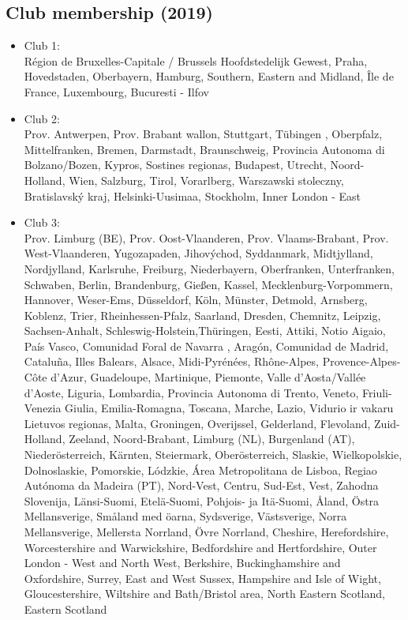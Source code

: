 \documentclass[11pt]{article}
\begin{document}
\subsection{Club membership (2019)}
\begin{itemize}
\item Club 1:\\
Région de Bruxelles-Capitale / Brussels Hoofdstedelijk Gewest, Praha, Hovedstaden, Oberbayern, Hamburg, Southern, Eastern and Midland, Île de France, Luxembourg, Bucuresti - Ilfov
\item Club 2:\\
Prov. Antwerpen, Prov. Brabant wallon, Stuttgart, Tübingen   , Oberpfalz, Mittelfranken, Bremen, Darmstadt, Braunschweig, Provincia Autonoma di Bolzano/Bozen, Kypros, Sostines regionas, Budapest, Utrecht, Noord-Holland, Wien, Salzburg, Tirol, Vorarlberg, Warszawski stoleczny, Bratislavský kraj, Helsinki-Uusimaa, Stockholm, Inner London - East
\item Club 3:\\
Prov. Limburg (BE), Prov. Oost-Vlaanderen, Prov. Vlaams-Brabant, Prov. West-Vlaanderen, Yugozapaden, Jihovýchod, Syddanmark, Midtjylland, Nordjylland, Karlsruhe, Freiburg, Niederbayern, Oberfranken, Unterfranken, Schwaben, Berlin, Brandenburg, Gießen, Kassel, Mecklenburg-Vorpommern, Hannover, Weser-Ems, Düsseldorf, Köln, Münster, Detmold, Arnsberg, Koblenz, Trier, Rheinhessen-Pfalz, Saarland, Dresden, Chemnitz, Leipzig, Sachsen-Anhalt, Schleswig-Holstein,Thüringen, Eesti, Attiki, Notio Aigaio, País Vasco, Comunidad Foral de Navarra
, Aragón, Comunidad de Madrid, Cataluña, Illes Balears, Alsace,  Midi-Pyrénées, Rhône-Alpes, Provence-Alpes-Côte d'Azur, Guadeloupe, Martinique, Piemonte, Valle d'Aosta/Vallée d'Aoste, Liguria, Lombardia, Provincia Autonoma di Trento, Veneto, Friuli-Venezia Giulia, Emilia-Romagna, Toscana, Marche, Lazio, Vidurio ir vakaru Lietuvos regionas, Malta, Groningen, Overijssel, Gelderland, Flevoland, Zuid-Holland, Zeeland, Noord-Brabant, Limburg (NL), Burgenland (AT), Niederösterreich, Kärnten, Steiermark, Oberösterreich, Slaskie, Wielkopolskie, Dolnoslaskie, Pomorskie, Lódzkie, Área Metropolitana de Lisboa, Regiao Autónoma da Madeira (PT), Nord-Vest, Centru, Sud-Est, Vest, Zahodna Slovenija, Länsi-Suomi, Etelä-Suomi, 	
Pohjois- ja Itä-Suomi, Åland, Östra Mellansverige, Småland med öarna, Sydsverige, Västsverige, Norra Mellansverige, Mellersta Norrland, Övre Norrland, Cheshire, Herefordshire, Worcestershire and Warwickshire, Bedfordshire and Hertfordshire, Outer London - West and North West, Berkshire, Buckinghamshire and Oxfordshire, Surrey, East and West Sussex, Hampshire and Isle of Wight, Gloucestershire, Wiltshire and Bath/Bristol area, North Eastern Scotland, Eastern Scotland



\end{itemize}
\end{document}
